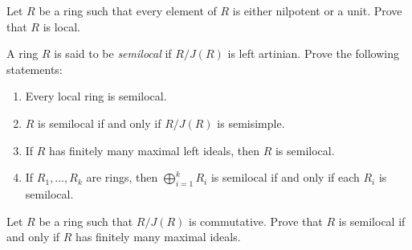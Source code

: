 \begin{exercise}
\label{xca:nilp_or_unit}
    Let $R$ be a ring such that every element of $R$ is either 
    nilpotent or a unit. Prove that $R$ is local. 
\end{exercise}

\begin{bonus}
\label{xca:semilocal}
    A ring $R$ is said to be \emph{semilocal} if $R/J(R)$ is left artinian. 
    Prove the following statements:
    \begin{enumerate}
        \item Every local ring is semilocal.
        \item $R$ is semilocal if and only if $R/J(R)$ is semisimple.
        \item If $R$ has finitely many maximal left ideals, then $R$ is semilocal. 
        \item If $R_1,\dots,R_k$ are rings, then $\bigoplus_{i=1}^k R_i$ is semilocal
            if and only if each $R_i$ is semilocal. 
    \end{enumerate}
\end{bonus}

\begin{bonus}
\label{xca:semilocal_commutative}
    Let $R$ be a ring such that $R/J(R)$ is commutative. Prove
    that $R$ is semilocal if and only if $R$ has finitely many maximal ideals. 
\end{bonus}





